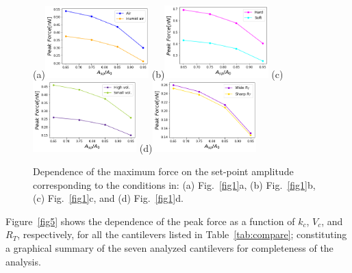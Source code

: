\documentclass[letterpaper,compsoc,twoside]{IEEEtran}
\begin{document}
\begin{figure}[H]
\centering
\subfigure(a){\includegraphics[width=40mm]{./fig4aHR3}}
\subfigure(b){\includegraphics[width=40mm]{./fig4bHR3}}
\subfigure(c){\includegraphics[width=40mm]{./fig4cHR3}}
\subfigure(d){\includegraphics[width=40mm]{./fig4dHR3}}
\caption{Dependence of the maximum force on the set-point amplitude corresponding to the conditions in: (a)  Fig.~\ref{fig1}a, (b) Fig.~\ref{fig1}b, (c) Fig.~\ref{fig1}c, and (d) Fig.~\ref{fig1}d.} \label{fig4}
\end{figure}

Figure~\ref{fig5} shows the dependence of the peak force as a function of $k_c$, $V_c$, and $R_T$, respectively, for all the cantilevers listed in Table~\ref{tab:compare}; constituting a graphical summary of the seven analyzed cantilevers for completeness of the analysis.
\end{document}

